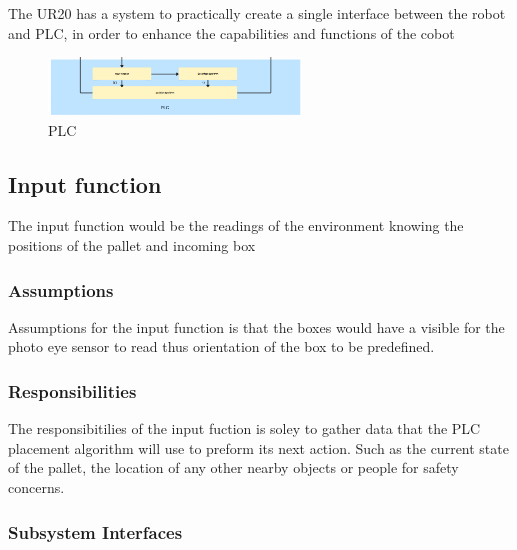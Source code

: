 The UR20 has a system to practically create a single interface between the robot and PLC, in order to enhance the capabilities and functions of the cobot

\begin{figure}[h!]
	\centering
 	\includegraphics[width=0.60\textwidth]{images/Plc}
 \caption{PLC }
\end{figure}

\subsection{Input function}
The input function would be the readings of the environment knowing the positions of the pallet and incoming box

\subsubsection{Assumptions}
Assumptions for the input function is that the boxes would have a visible for the photo eye sensor to read thus orientation of the box to be predefined. 

\subsubsection{Responsibilities}
The responsibitilies of the input fuction is soley to gather data that the PLC placement algorithm will use to preform its next action. Such as the current state of the pallet, the location of any other nearby objects or people for safety concerns.

\subsubsection{Subsystem Interfaces}

